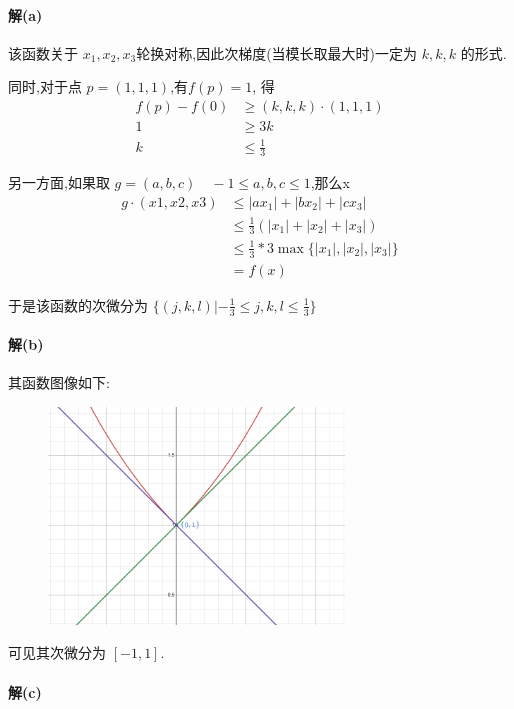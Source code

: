 \documentclass[a4paper]{article}
\begin{document}
\paragraph{解(a)}
该函数关于 \(x_1,x_2,x_3\)轮换对称,因此次梯度(当模长取最大时)一定为 \(k,k,k\) 的形式.

同时,对于点 \(p=(1,1,1)\),有\(f(p) = 1\), 得 
\[\begin{aligned}
     f(p) - f(0) &\geq (k,k,k) \cdot (1,1,1)\\
     1 &\geq 3k \\
     k &\leq \frac{1}{3}
\end{aligned}\]

另一方面,如果取 $g = (a,b,c) \quad -1 \leq a,b,c \leq 1 $,那么x
 \[\begin{aligned}
    g \cdot (x1,x2,x3)  & \leq |ax_1| + |bx_2| + |cx_3|  \\
    &\leq \frac{1}{3}(|x_1| + |x_2| + |x_3|)  \\
    &\leq \frac{1}{3} * 3 \max\{|x_1|,|x_2|,|x_3|\}  \\
    & = f(x) 
\end{aligned}\]


于是该函数的次微分为 \(\{(j,k,l) | -\frac{1}{3} \leq j,k,l \leq \frac{1}{3}\}\)

\paragraph{解(b)}
其函数图像如下:

\begin{figure}[H]
    \centering
    \includegraphics[width=0.7\textwidth]{pic/p5s2.png}
\end{figure}

可见其次微分为 \([-1,1]\).
\paragraph{解(c)}
\end{document}
